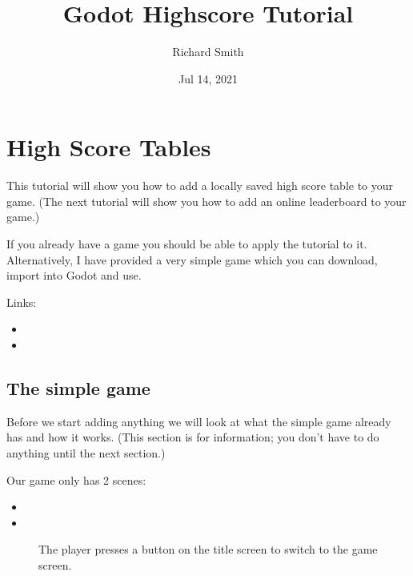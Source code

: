 \documentclass[a4paper,12pt,english]{sphinxmanual}
\title{Godot Highscore Tutorial}
\date{Jul 14, 2021}
\author{Richard Smith}
\begin{document}
\pagestyle{empty}
\sphinxmaketitle
\pagestyle{plain}
\sphinxtableofcontents
\pagestyle{normal}
\label{\detokenize{index::doc}}



\chapter{High Score Tables}
\label{\detokenize{tutorial:high-score-tables}}\label{\detokenize{tutorial::doc}}
\sphinxAtStartPar
This tutorial will show you how to add a locally saved high score table
to your game. (The next tutorial will show you how to add an online
leaderboard to your game.)

\sphinxAtStartPar
If you already have a game you should be able to apply the tutorial to
it. Alternatively, I have provided a very simple game which you can
download, import into Godot and use.

\sphinxAtStartPar
Links:
\begin{itemize}
\item {} 
\sphinxAtStartPar
{}

\item {} 
\sphinxAtStartPar
{}

\end{itemize}


\section{The simple game}
\label{\detokenize{tutorial:the-simple-game}}
\sphinxAtStartPar
Before we start adding anything we will look at what the simple game
already has and how it works. (This section is for information; you
don’t have to do anything until the next section.)

\sphinxAtStartPar
Our game only has 2 scenes:
\begin{itemize}
\item {} 
\sphinxAtStartPar
{}

\item {} 
\sphinxAtStartPar
{}

\end{itemize}

\begin{figure}[htbp]
\centering
\capstart

\noindent{}
\caption{The player presses a button on the title screen to switch to the game
screen.}\label{\detokenize{tutorial:id1}}\end{figure}
\end{document}
